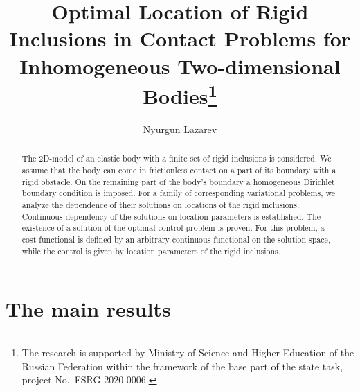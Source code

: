 \documentclass[12pt]{llncs}
\begin{document}
%

\fi

\title{Optimal Location of Rigid Inclusions  in Contact Problems for Inhomogeneous Two-dimensional Bodies\thanks{The research is
supported by Ministry of Science and Higher Education of the
Russian Federation within the framework of the base part of the
state task, project No.~FSRG-2020-0006.}}
\author{Nyurgun Lazarev
}

\maketitle

\begin{abstract}
The 2D-model of an elastic body with a finite set of rigid
inclusions is considered. We assume that the body can come in
frictionless contact on a part of its boundary with a rigid
obstacle. On the remaining part of the body's boundary a
homogeneous Dirichlet boundary condition is imposed. For a family
of corresponding variational problems, we analyze the dependence
of their solutions on locations of the rigid inclusions.
Continuous dependency of the solutions on location parameters is
established. The existence of a solution of the optimal control
problem is proven. For this problem, a cost functional is defined
by an arbitrary continuous functional on the solution space, while
the control is given by location parameters of the rigid
inclusions.

\end{abstract}

\section{The main results}
\end{document}
